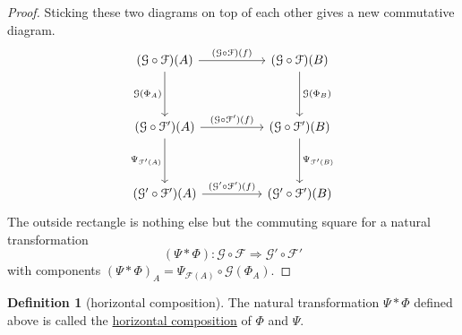 \documentclass[a4paper,10pt]{scrreprt}
\newcommand{\defn}[1]{\ul{#1}}
\theoremstyle{definition}
\newtheorem{definition}{Definition}[section]
\theoremstyle{plain}
\theoremstyle{remark}
\begin{document}
\begin{proof}
  Sticking these two diagrams on top of each other gives a new commutative diagram.
  \begin{equation*}
    \begin{tikzcd}[row sep=huge, column sep=huge]
      (\mathcal{G} \circ \mathcal{F})(A)
      \arrow[d, swap, "\mathcal{G}(\Phi_{A})"] 
      \arrow[r, "(\mathcal{G} \circ \mathcal{F})(f)"] 
      & (\mathcal{G} \circ \mathcal{F})(B)
      \arrow[d, "\mathcal{G}(\Phi_{B})"] 
      \\
      (\mathcal{G} \circ \mathcal{F}')(A) 
      \arrow[r, "(\mathcal{G} \circ \mathcal{F}')(f)"] 
      \arrow[d, swap, "\Psi_{\mathcal{F}'(A)}"]
      & (\mathcal{G} \circ \mathcal{F}')(B) 
      \arrow[d, "\Psi_{\mathcal{F}'(B)}"]
      \\
      (\mathcal{G}' \circ \mathcal{F}')(A)
      \arrow[r, "(\mathcal{G}' \circ \mathcal{F}')(f)"]
      & (\mathcal{G}' \circ \mathcal{F}')(B)
    \end{tikzcd}
  \end{equation*}
  The outside rectangle is nothing else but the commuting square for a natural transformation 
  \begin{equation*}
    (\Psi * \Phi)\colon \mathcal{G} \circ \mathcal{F} \Rightarrow \mathcal{G'} \circ \mathcal{F}' 
  \end{equation*}
  with components $(\Psi * \Phi)_{A} = \Psi_{\mathcal{F}(A)} \circ \mathcal{G}(\Phi_{A})$.
\end{proof}

\begin{definition}[horizontal composition]
  \label{def:horizontalcomposition}
  The natural transformation $\Psi * \Phi$ defined above is called the \defn{horizontal composition} of $\Phi$ and $\Psi$.
\end{definition}
\end{document}
